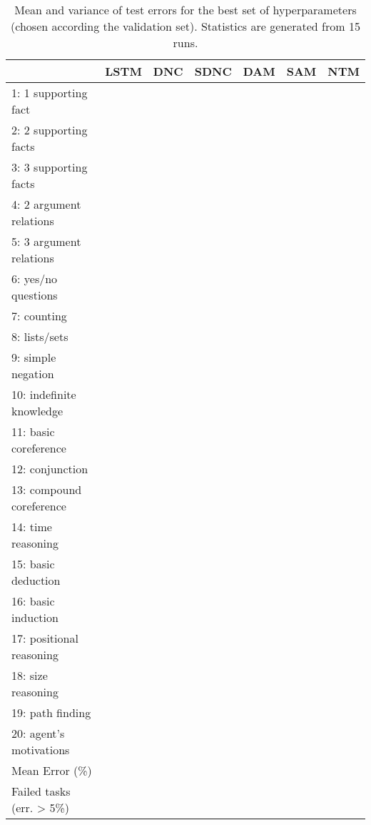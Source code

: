 \documentclass{article}
\begin{document}
\begin{landscape}
\begin{table}[h]
    \centering
    \begin{tabular}{l|c|c|c|c|c|c}
& LSTM & DNC & SDNC & DAM & SAM & NTM \\
\hline
 1:    1 supporting fact  &  &  &  &  &  &  \\
 2:   2 supporting facts  &  &  &  &  &  &  \\
 3:   3 supporting facts  &  &  &  &  &  &  \\
 4: 2 argument relations  &  &  &  &  &  &  \\
 5: 3 argument relations  &  &  &  &  &  &  \\
 6:     yes/no questions  &  &  &  &  &  &  \\
 7:             counting  &  &  &  &  &  &  \\
 8:           lists/sets  &  &  &  &  &  &  \\
 9:      simple negation  &  &  &  &  &  &  \\
10: indefinite knowledge  &  &  &  &  &  &  \\
11:    basic coreference  &  &  &  &  &  &  \\
12:          conjunction  &  &  &  &  &  &  \\
13: compound coreference  &  &  &  &  &  &  \\
14:       time reasoning  &  &  &  &  &  &  \\
15:      basic deduction  &  &  &  &  &  &  \\
16:      basic induction  &  &  &  &  &  &  \\
17: positional reasoning  &  &  &  &  &  &  \\
18:       size reasoning  &  &  &  &  &  &  \\
19:         path finding  &  &  &  &  &  &  \\
20:  agent's motivations  &  &  &  &  &  &  \\
\hline
Mean Error (\%)  &
 &  &  &  &  &  \\
Failed tasks (err. > 5\%) &  &  &  &  &  &  \\\end{tabular}
    \caption{Mean and variance of test errors for the best set of hyperparameters (chosen according the validation set). Statistics are generated from 15 runs.}
    \label{tab:babi:mean}
\end{table}

\end{landscape}
\end{document}
